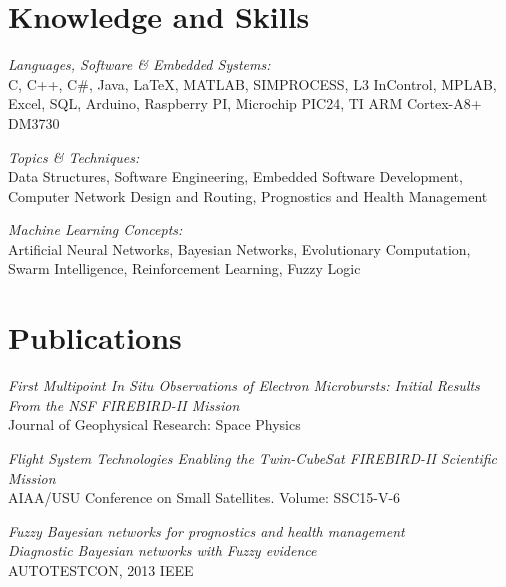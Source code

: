 \documentclass[line,margin]{res}
\begin{document}
\begin{resume}
\section{Knowledge and Skills} {\sl Languages, Software \& Embedded Systems:}\\
				C, C++, C\#, Java, \LaTeX, MATLAB, SIMPROCESS, L3 InControl, MPLAB, Excel, SQL, Arduino, Raspberry PI, Microchip PIC24, TI ARM Cortex-A8+ DM3730
                
                {\sl Topics \& Techniques:}\\Data Structures, Software Engineering, Embedded Software Development, Computer Network Design and Routing, Prognostics and Health Management
                
                
                {\sl Machine Learning Concepts:}\\Artificial Neural Networks, Bayesian Networks, Evolutionary Computation, Swarm Intelligence, Reinforcement Learning, Fuzzy Logic
			
\section{Publications} 
{\sl First Multipoint In Situ Observations of Electron Microbursts: Initial Results From the NSF FIREBIRD-II Mission}\\
Journal of Geophysical Research: Space Physics

{\sl Flight System Technologies Enabling the Twin-CubeSat FIREBIRD-II Scientific Mission}\\
AIAA/USU Conference on Small Satellites. Volume: SSC15-V-6 

{\sl Fuzzy Bayesian networks for prognostics and health management}\\


{\sl Diagnostic Bayesian networks with Fuzzy evidence}\\
AUTOTESTCON, 2013 IEEE	

		
			
\end{resume}
\end{document}
